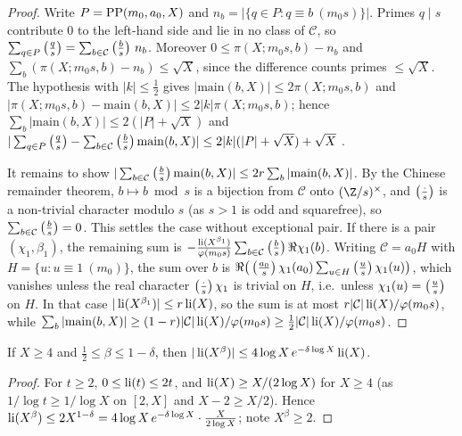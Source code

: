 \begin{proof}
Write $P=\operatorname{PP}(m_0,a_0,X)$ and $n_b=|\{q\in P:q\equiv b\ (m_0s)\}|$. Primes $q\mid s$ contribute $0$ to the
left-hand side and lie in no class of $\mathcal C$, so $\sum_{q\in P}\left(\frac{q}{s}\right)=\sum_{b\in\mathcal C}\left(\frac{b}{s}\right)\,n_b$.
Moreover $0\le\pi(X;m_0s,b)-n_b$ and $\sum_b(\pi(X;m_0s,b)-n_b)\le\sqrt X$, since the difference counts primes
$\le\sqrt X$. The hypothesis with $|k|\le\frac12$ gives $|\mathrm{main}(b,X)|\le2\pi(X;m_0s,b)$ and
$|\pi(X;m_0s,b)-\mathrm{main}(b,X)|\le2|k|\pi(X;m_0s,b)$; hence $\sum_b|\mathrm{main}(b,X)|\le2(|P|+\sqrt X)$ and
$|\sum_{q\in P}\left(\frac{q}{s}\right)-\sum_{b\in\mathcal C}\left(\frac{b}{s}\right)\mathrm{main}(b,X)|\le2|k|(|P|+\sqrt X)+\sqrt X$
.

It remains to show $|\sum_{b\in\mathcal C}\left(\frac{b}{s}\right)\mathrm{main}(b,X)|\le2r\sum_b|\mathrm{main}(b,X)|$. By the
Chinese remainder theorem, $b\mapsto b\bmod s$ is a bijection from $\mathcal C$ onto $(\Z/s)^\times$, and
$\left(\frac{\cdot}{s}\right)$ is a non-trivial character modulo $s$ (as $s>1$ is odd and squarefree), so
$\sum_{b\in\mathcal C}\left(\frac{b}{s}\right)=0$. This settles the case without exceptional pair. If there is a pair
$(\chi_1,\beta_1)$, the remaining sum is $-\frac{\operatorname{li}(X^{\beta_1})}{\varphi(m_0s)}\sum_{b\in\mathcal C}
\left(\frac{b}{s}\right)\Re\chi_1(b)$. Writing $\mathcal C=a_0H$ with $H=\{u:u\equiv1\ (m_0)\}$, the sum over $b$ is
$\Re\big(\left(\frac{a_0}{s}\right)\chi_1(a_0)\sum_{u\in H}\left(\frac{u}{s}\right)\chi_1(u)\big)$, which vanishes unless the real
character $\left(\frac{\cdot}{s}\right)\chi_1$ is trivial on $H$, i.e.\ unless $\chi_1(u)=\left(\frac{u}{s}\right)$ on $H$. In that case
$|\operatorname{li}(X^{\beta_1})|\le r\operatorname{li}(X)$, so the sum is at most $r|\mathcal C|\operatorname{li}(X)/\varphi(m_0s)$,
while $\sum_b|\mathrm{main}(b,X)|\ge(1-r)|\mathcal C|\operatorname{li}(X)/\varphi(m_0s)\ge\frac12|\mathcal C|\operatorname{li}(X)/\varphi(m_0s)$.
\end{proof}

\begin{lemma}\label{pf:top-supply:lipow}
If $X\ge4$ and $\frac12\le\beta\le1-\delta$, then $|\operatorname{li}(X^\beta)|\le4\log X\,e^{-\delta\log X}\operatorname{li}(X)$.
\end{lemma}

\begin{proof}
For $t\ge2$, $0\le\operatorname{li}(t)\le2t$, and $\operatorname{li}(X)\ge X/(2\log X)$ for $X\ge4$ (as $1/\log t\ge1/\log X$
on $[2,X]$ and $X-2\ge X/2$). Hence $\operatorname{li}(X^\beta)\le2X^{1-\delta}=4\log X\,e^{-\delta\log X}\cdot\frac
X{2\log X}$; note $X^\beta\ge2$.
\end{proof}

